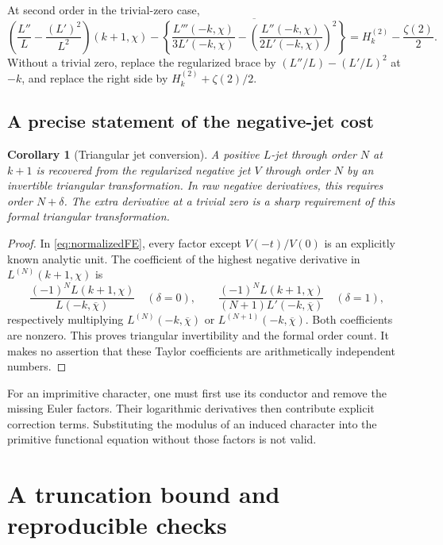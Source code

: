 \documentclass[11pt]{article}
\newtheorem{corollary}[theorem]{Corollary}
\theoremstyle{definition}
\theoremstyle{remark}
\begin{document}
At second order in the trivial-zero case,
\begin{equation}\label{eq:secondzero}
 \left(\frac{L''}{L}-\frac{(L')^2}{L^2}\right)(k+1,\chi)
 -\overline{\left\{\frac{L'''(-k,\chi)}{3L'(-k,\chi)}
        -\left(\frac{L''(-k,\chi)}{2L'(-k,\chi)}\right)^2\right\}}
       =H_k^{(2)}-\frac{\zeta(2)}2.
\end{equation}
Without a trivial zero, replace the regularized brace by $(L''/L)-(L'/L)^2$ at $-k$, and replace the right side by $H_k^{(2)}+\zeta(2)/2$.

\subsection{A precise statement of the negative-jet cost}
\begin{corollary}[Triangular jet conversion]\label{cor:jetcost}
A positive $L$-jet through order $N$ at $k+1$ is recovered from the regularized negative jet $V$ through order $N$ by an invertible triangular transformation. In raw negative derivatives, this requires order $N+\delta$. The extra derivative at a trivial zero is a sharp requirement of this formal triangular transformation.
\end{corollary}
\begin{proof}
In \eqref{eq:normalizedFE}, every factor except $V(-t)/V(0)$ is an explicitly known analytic unit. The coefficient of the highest negative derivative in $L^{(N)}(k+1,\chi)$ is
\[
 \frac{(-1)^N L(k+1,\chi)}{L(-k,\overline\chi)}\quad(\delta=0),
 \qquad
 \frac{(-1)^N L(k+1,\chi)}{(N+1)L'(-k,\overline\chi)}\quad(\delta=1),
\]
respectively multiplying $L^{(N)}(-k,\overline\chi)$ or $L^{(N+1)}(-k,\overline\chi)$. Both coefficients are nonzero. This proves triangular invertibility and the formal order count. It makes no assertion that these Taylor coefficients are arithmetically independent numbers.
\end{proof}

For an imprimitive character, one must first use its conductor and remove the missing Euler factors. Their logarithmic derivatives then contribute explicit correction terms. Substituting the modulus of an induced character into the primitive functional equation without those factors is not valid.

\section{A truncation bound and reproducible checks}
\label{sec:verification}
\end{document}
